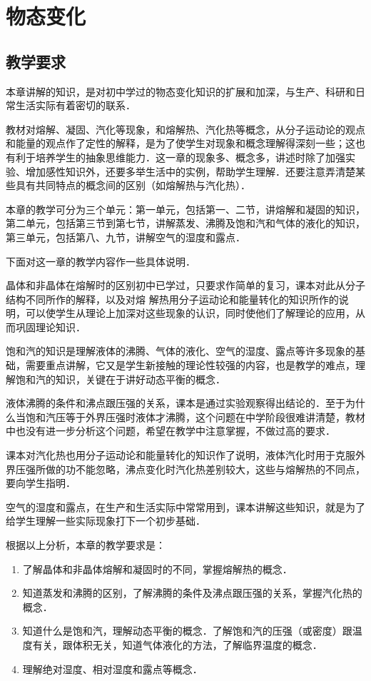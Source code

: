 \chapter{物态变化}\minitoc[n]
\section{教学要求}
本章讲解的知识，是对初中学过的物态变化知识的扩展和加深，与生产、科研和日常生活实际有着密切的联系．

教材对熔解、凝固、汽化等现象，和熔解热、汽化热等概念，从分子运动论的观点和能量的观点作了定性的解释，是为了使学生对现象和概念理解得深刻一些；这也有利于培养学生的抽象思维能力．这一章的现象多、概念多，讲述时除了加强实验、增加感性知识外，还要多举生活中的实例，帮助学生理解．还要注意弄清楚某些具有共同特点的概念间的区别（如熔解热与汽化热）．

本章的教学可分为三个单元：第一单元，包括第一、二节，讲熔解和凝固的知识，第二单元，包括第三节到第七节，讲解蒸发、沸腾及饱和汽和气体的液化的知识，第三单元，包括第八、九节，讲解空气的湿度和露点．

下面对这一章的教学内容作一些具体说明．

晶体和非晶体在熔解时的区别初中已学过，只要求作简单的复习，课本对此从分子结构不同所作的解释，以及对熔
解热用分子运动论和能量转化的知识所作的说明，可以使学生从理论上加深对这些现象的认识，同时使他们了解理论的应用，从而巩固理论知识．

饱和汽的知识是理解液体的沸腾、气体的液化、空气的湿度、露点等许多现象的基础，需要重点讲解，它又是学生新接触的理论性较强的内容，也是教学的难点，理解饱和汽的知识，关键在于讲好动态平衡的概念．

液体沸腾的条件和沸点跟压强的关系，课本是通过实验观察得出结论的．至于为什么当饱和汽压等于外界压强时液体才沸腾，这个问题在中学阶段很难讲清楚，教材中也没有进一步分析这个问题，希望在教学中注意掌握，不做过高的要求．

课本对汽化热也用分子运动论和能量转化的知识作了说明，液体汽化时用于克服外界压强所做的功不能忽略，沸点变化时汽化热差别较大，这些与熔解热的不同点，要向学生指明．

空气的湿度和露点，在生产和生活实际中常常用到，课本讲解这些知识，就是为了给学生理解一些实际现象打下一个初步基础．

根据以上分析，本章的教学要求是：
\begin{enumerate}
\item 了解晶体和非晶体熔解和凝固时的不同，掌握熔解热的概念．
\item 知道蒸发和沸腾的区别，了解沸腾的条件及沸点跟压强的关系，掌握汽化热的概念．
\item 知道什么是饱和汽，理解动态平衡的概念．了解饱和汽的压强（或密度）跟温度有关，跟体积无关，知道气体液化的方法，了解临界温度的概念．
\item 理解绝对湿度、相对湿度和露点等概念．
\end{enumerate}

